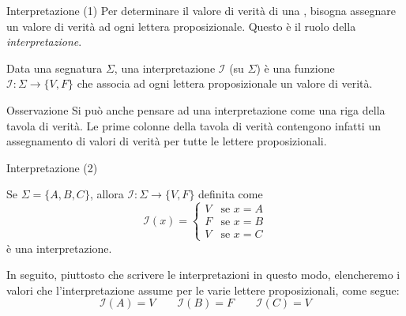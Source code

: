 \documentclass[aspectratio=169,10pt,dvipsnames,xcolor=table,handout]{beamer}
\newcommand{\mcI}{\mathcal{I}}
\begin{document}
\begin{frame}{Interpretazione (1)}
    Per determinare il valore di verità di una \fp, bisogna assegnare un valore di verità ad ogni lettera proposizionale. Questo è il ruolo della \emph{interpretazione}.

    \pause
    \begin{definition}[Interpretazione]
        Data una segnatura $\Sigma$, una interpretazione $\mcI$ (su $\Sigma$) è una funzione $\mcI: \Sigma \to \{V, F\}$ che associa ad ogni lettera proposizionale un valore di verità.
    \end{definition}

    \pause
    \begin{block}{Osservazione}
        Si può anche pensare ad una interpretazione come una riga della tavola di verità. Le prime colonne della tavola di verità contengono infatti un assegnamento di valori di verità per tutte le lettere proposizionali.
    \end{block}
\end{frame}

\begin{frame}{Interpretazione (2)}
    \begin{example}
        Se $\Sigma=\{A, B, C\}$, allora $\mcI: \Sigma \to \{V, F\}$ definita come
        \[
            \mcI(x) = \begin{cases}
                V & \text{se $x=A$} \\
                F & \text{se $x=B$} \\
                V & \text{se $x=C$}
            \end{cases}
        \]
        è una interpretazione.

        \medskip In seguito, piuttosto che scrivere le interpretazioni in questo modo, elencheremo i valori che l'interpretazione assume per le varie lettere proposizionali, come segue:
        \[ \mcI(A)=V \qquad \mcI(B)=F \qquad \mcI(C)=V \]
    \end{example}
\end{frame}
\end{document}
